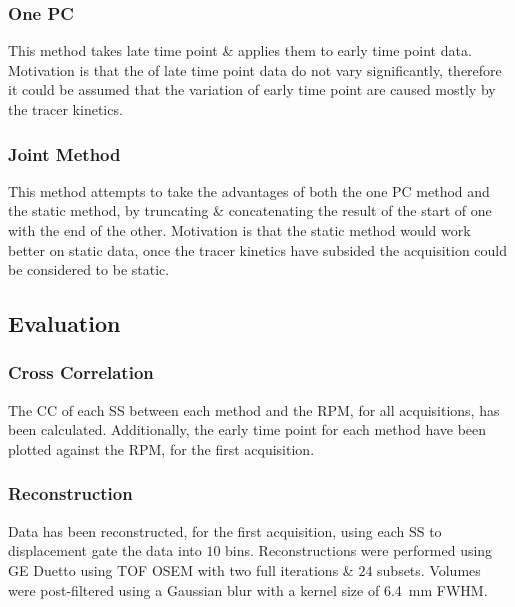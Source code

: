         \subsubsection{One \gls{PC}} \label{sec:one_pc}
            This method takes late time point  \& applies them to early time point data. Motivation is that the  of late time point data do not vary significantly, therefore it could be assumed that the variation of early time point  are caused mostly by the tracer kinetics.
        
        \subsubsection{Joint Method} \label{sec:joint_method}
            This method attempts to take the advantages of both the one \gls{PC} method and the static method, by truncating \& concatenating the result of the start of one with the end of the other. Motivation is that the static method would work better on static data, once the tracer kinetics have subsided the acquisition could be considered to be static.
    
    
    \subsection{Evaluation} \label{sec:evaluation}
        \subsubsection{Cross Correlation} \label{sec:cross_correlation}
            The \gls{CC} of each \gls{SS} between each method and the \gls{RPM}, for all acquisitions, has been calculated. Additionally, the early time point  for each method have been plotted against the \gls{RPM}, for the first acquisition.
        
        \subsubsection{Reconstruction} \label{sec:reconstruction}
            Data has been reconstructed, for the first acquisition, using each \gls{SS} to displacement gate the data into $10$ bins. Reconstructions were performed using \gls{GE} Duetto using \gls{TOF} \gls{OSEM} with two full iterations \& $24$ subsets.%
            Volumes were post-filtered using a Gaussian blur with a kernel size of \SI{6.4}{\milli\metre} \gls{FWHM}.
            
